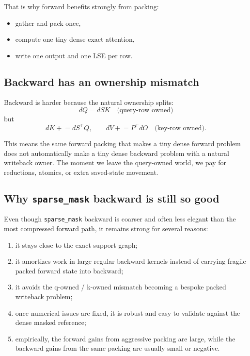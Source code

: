 \documentclass[11pt]{article}
\begin{document}
That is why forward benefits strongly from packing:
\begin{itemize}[leftmargin=1.5em]
    \item gather and pack once,
    \item compute one tiny dense exact attention,
    \item write one output and one LSE per row.
\end{itemize}

\subsection{Backward has an ownership mismatch}

Backward is harder because the natural ownership splits:
\[
dQ = dS K \quad \text{(query-row owned)}
\]
but
\[
dK \mathrel{+}= dS^\top Q, \qquad
dV \mathrel{+}= P^\top dO
\quad \text{(key-row owned)}.
\]

This means the same forward packing that makes a tiny dense forward problem does
not automatically make a tiny dense backward problem with a natural writeback
owner. The moment we leave the query-owned world, we pay for reductions,
atomics, or extra saved-state movement.

\subsection{Why \texttt{sparse\_mask} backward is still so good}

Even though \texttt{sparse\_mask} backward is coarser and often less elegant
than the most compressed forward path, it remains strong for several reasons:
\begin{enumerate}[leftmargin=1.5em]
    \item it stays close to the exact support graph;
    \item it amortizes work in large regular backward kernels instead of carrying
    fragile packed forward state into backward;
    \item it avoids the q-owned / k-owned mismatch becoming a bespoke packed
    writeback problem;
    \item once numerical issues are fixed, it is robust and easy to validate
    against the dense masked reference;
    \item empirically, the forward gains from aggressive packing are large,
    while the backward gains from the same packing are usually small or negative.
\end{enumerate}
\end{document}
